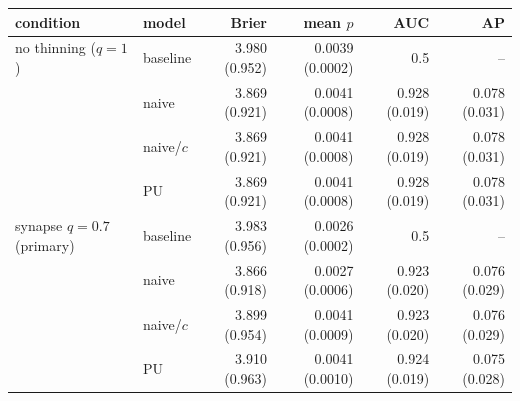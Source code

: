\begin{tabular}{@{}llrrrr@{}}\toprule
condition & model & Brier & mean $p$ & AUC & AP\\\midrule
no thinning ($q=1$) & baseline & 3.980 (0.952) & 0.0039 (0.0002) & 0.5 & --\\
 & naive & 3.869 (0.921) & 0.0041 (0.0008) & 0.928 (0.019) & 0.078 (0.031)\\
 & naive/$c$ & 3.869 (0.921) & 0.0041 (0.0008) & 0.928 (0.019) & 0.078 (0.031)\\
 & PU & 3.869 (0.921) & 0.0041 (0.0008) & 0.928 (0.019) & 0.078 (0.031)\\
\midrule
synapse $q=0.7$ (primary) & baseline & 3.983 (0.956) & 0.0026 (0.0002) & 0.5 & --\\
 & naive & 3.866 (0.918) & 0.0027 (0.0006) & 0.923 (0.020) & 0.076 (0.029)\\
 & naive/$c$ & 3.899 (0.954) & 0.0041 (0.0009) & 0.923 (0.020) & 0.076 (0.029)\\
 & PU & 3.910 (0.963) & 0.0041 (0.0010) & 0.924 (0.019) & 0.075 (0.028)\\
\bottomrule
\end{tabular}
